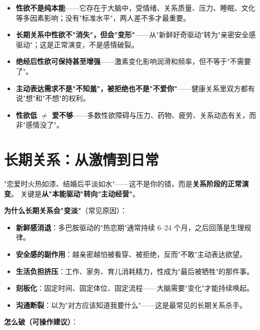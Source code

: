 \documentclass[12pt,UTF8,openany]{ctexbook}
\begin{document}
\begin{itemize}[leftmargin=2em,itemsep=0.3em]
  \item \textbf{性欲不是纯本能}——它存在于大脑中，受情绪、关系质量、压力、睡眠、文化等多因素影响；没有"标准水平"，两人差不多才最重要。
  \item \textbf{长期关系中性欲不"消失"，但会"变形"}——从"新鲜好奇驱动"转为"亲密安全感驱动"；这是正常演变，不是感情破裂。
  \item \textbf{绝经后性欲可保持甚至增强}——激素变化影响润滑和频率，但不等于"不需要了"。
  \item \textbf{主动表达需求不是"不知羞"，被拒绝也不是"不爱你"}——健康关系里双方都有说"想"和"不想"的权利。
  \item \textbf{性欲低 $\ne$ 爱不够}——多数性欲障碍与压力、药物、疲劳、关系动态有关，而非"感情没了"。
\end{itemize}

\section{长期关系：从激情到日常}

"恋爱时火热如漆、结婚后平淡如水"——这不是你的错，而是\textbf{关系阶段的正常演变}。
关键是\textbf{从"本能驱动"转向"主动经营"}。

\textbf{为什么长期关系会"变淡"}（常见原因）：

\begin{itemize}[leftmargin=2em,itemsep=0.3em]
  \item \textbf{新鲜感消退}：多巴胺驱动的"热恋期"通常持续 6--24 个月，之后回落是生理规律。
  \item \textbf{安全感的副作用}：越亲密越怕被看穿、被拒绝，反而"不敢"主动表达欲望。
  \item \textbf{生活负担挤压}：工作、家务、育儿消耗精力，性成为"最后被牺牲"的那件事。
  \item \textbf{刻板化}：固定时间、固定体位、固定流程——大脑需要"变化"才能持续唤起。
  \item \textbf{沟通断裂}：以为"对方应该知道我要什么"——这是最常见的长期关系杀手。
\end{itemize}

\textbf{怎么破（可操作建议）}：
\end{document}
